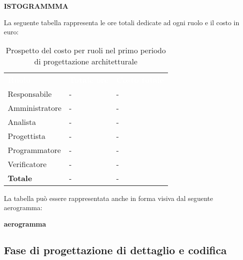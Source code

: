 \textbf{ISTOGRAMMMA}


La seguente tabella rappresenta le ore totali dedicate ad ogni ruolo e il costo in euro:

\begin{table}[!htbp]
\begin{center}
\renewcommand{\arraystretch}{1.5}
\begin{tabular}{ m{}<{\centering}  m{}<{\centering} m{}<{\centering}}
	\rowcolor{darkblue}
	\textcolor{white}{\textbf{Ruolo}}&\textcolor{white}{\textbf{Totale ore}}&\textcolor{white}{\textbf{Costo totale}}\\ 

	Responsabile  & - & - \\	

	Amministratore & - & - \\
	
	Analista & - & - \\
	
	Progettista & - & - \\
	
	Programmatore & - & - \\
	
	Verificatore & - & - \\
	
	\textbf{Totale} & - & - \\
	
\end{tabular}
\caption{Prospetto del costo per ruoli nel primo periodo di progettazione architetturale}
\end{center}
\end{table}

La tabella può essere rappresentata anche in forma visiva dal seguente aerogramma:

\textbf{aerogramma}






\subsection{Fase di progettazione di dettaglio e codifica}
